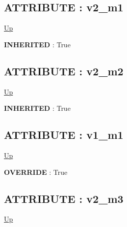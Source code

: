 \subsection*{ATTRIBUTE : v2\_m1}
\hypertarget{ecldoc:intest.in1intest.example_2.mod_1.v2_m1}{}
\par
\begin{minipage}[t]{\textwidth}
\begin{flushleft}
  
\end{flushleft}
\end{minipage}
\hyperlink{ecldoc:intest.in1intest.example_2.mod_3}{Up} \\
\par
\par
\textbf{INHERITED} : True \\
\subsection*{ATTRIBUTE : v2\_m2}
\hypertarget{ecldoc:intest.in1intest.example_2.mod_2.v2_m2}{}
\par
\begin{minipage}[t]{\textwidth}
\begin{flushleft}
  
\end{flushleft}
\end{minipage}
\hyperlink{ecldoc:intest.in1intest.example_2.mod_3}{Up} \\
\par
\par
\textbf{INHERITED} : True \\
\subsection*{ATTRIBUTE : v1\_m1}
\hypertarget{ecldoc:intest.in1intest.example_2.mod_3.v1_m1}{}
\par
\begin{minipage}[t]{\textwidth}
\begin{flushleft}
  
\end{flushleft}
\end{minipage}
\hyperlink{ecldoc:intest.in1intest.example_2.mod_3}{Up} \\
\par
\par
\textbf{OVERRIDE} : True \\
\subsection*{ATTRIBUTE : v2\_m3}
\hypertarget{ecldoc:intest.in1intest.example_2.mod_3.v2_m3}{}
\par
\begin{minipage}[t]{\textwidth}
\begin{flushleft}
  
\end{flushleft}
\end{minipage}
\hyperlink{ecldoc:intest.in1intest.example_2.mod_3}{Up} \\
\par
\par


